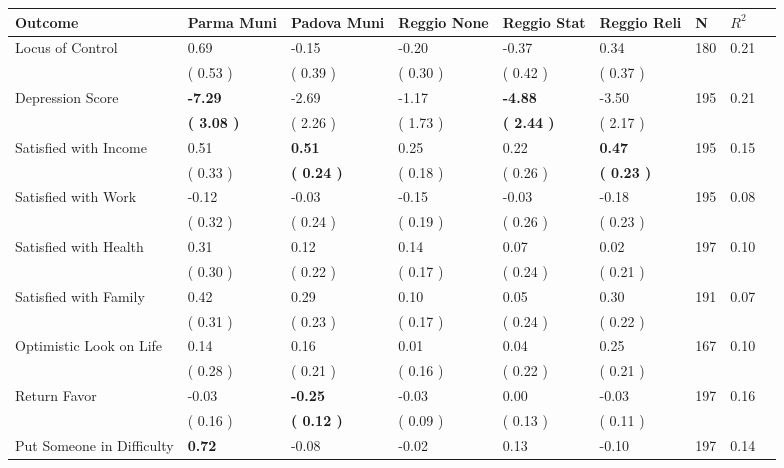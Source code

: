 \begin{tabular}{L{6.2cm} C{1.8cm} C{1.8cm} C{1.8cm} C{1.8cm} C{1.8cm} C{1.8cm} C{0.3cm} C{0.3cm}}
\toprule
 \textbf{Outcome} & \textbf{Parma Muni} & \textbf{Padova Muni} & \textbf{Reggio None} & \textbf{Reggio Stat} & \textbf{Reggio Reli} & \textbf{N} & \textbf{$ R^2$} \\
\midrule
Locus of Control &      0.69 &     -0.15 &     -0.20 &     -0.37 &      0.34  & 180 &       0.21 \\ 
 & (     0.53 ) & (     0.39 ) & (     0.30 ) & (     0.42 ) & (     0.37 )  & \\
Depression Score & \textbf{    -7.29} &     -2.69 &     -1.17 & \textbf{    -4.88} &     -3.50  & 195 &       0.21 \\ 
 & \textbf{(     3.08 )} & (     2.26 ) & (     1.73 ) & \textbf{(     2.44 )} & (     2.17 )  & \\
Satisfied with Income &      0.51 & \textbf{     0.51} &      0.25 &      0.22 & \textbf{     0.47}  & 195 &       0.15 \\ 
 & (     0.33 ) & \textbf{(     0.24 )} & (     0.18 ) & (     0.26 ) & \textbf{(     0.23 )}  & \\
Satisfied with Work &     -0.12 &     -0.03 &     -0.15 &     -0.03 &     -0.18  & 195 &       0.08 \\ 
 & (     0.32 ) & (     0.24 ) & (     0.19 ) & (     0.26 ) & (     0.23 )  & \\
Satisfied with Health &      0.31 &      0.12 &      0.14 &      0.07 &      0.02  & 197 &       0.10 \\ 
 & (     0.30 ) & (     0.22 ) & (     0.17 ) & (     0.24 ) & (     0.21 )  & \\
Satisfied with Family &      0.42 &      0.29 &      0.10 &      0.05 &      0.30  & 191 &       0.07 \\ 
 & (     0.31 ) & (     0.23 ) & (     0.17 ) & (     0.24 ) & (     0.22 )  & \\
Optimistic Look on Life &      0.14 &      0.16 &      0.01 &      0.04 &      0.25  & 167 &       0.10 \\ 
 & (     0.28 ) & (     0.21 ) & (     0.16 ) & (     0.22 ) & (     0.21 )  & \\
Return Favor &     -0.03 & \textbf{    -0.25} &     -0.03 &      0.00 &     -0.03  & 197 &       0.16 \\ 
 & (     0.16 ) & \textbf{(     0.12 )} & (     0.09 ) & (     0.13 ) & (     0.11 )  & \\
Put Someone in Difficulty & \textbf{     0.72} &     -0.08 &     -0.02 &      0.13 &     -0.10  & 197 &       0.14 \\ 

\end{tabular}
